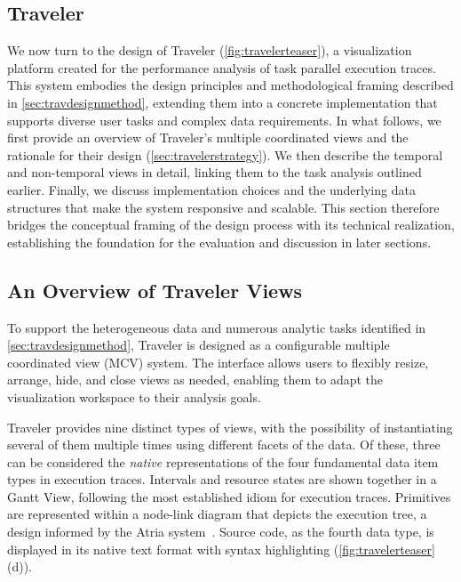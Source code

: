 \begin{refsection}
\section{Traveler}
\label{sec:travelerdesc}

We now turn to the design of Traveler (\autoref{fig:travelerteaser}), a visualization platform created for the performance analysis of task parallel execution traces. This system embodies the design principles and methodological framing described in \autoref{sec:travdesignmethod}, extending them into a concrete implementation that supports diverse user tasks and complex data requirements. In what follows, we first provide an overview of Traveler's multiple coordinated views and the rationale for their design (\autoref{sec:travelerstrategy}). We then describe the temporal and non-temporal views in detail, linking them to the task analysis outlined earlier. Finally, we discuss implementation choices and the underlying data structures that make the system responsive and scalable. This section therefore bridges the conceptual framing of the design process with its technical realization, establishing the foundation for the evaluation and discussion in later sections.

\subsection{An Overview of Traveler Views}
\label{sec:travelerstrategy}

To support the heterogeneous data and numerous analytic tasks identified in \autoref{sec:travdesignmethod}, Traveler is designed as a configurable multiple coordinated view (MCV) system. The interface allows users to flexibly resize, arrange, hide, and close views as needed, enabling them to adapt the visualization workspace to their analysis goals.

Traveler provides nine distinct types of views, with the possibility of instantiating several of them multiple times using different facets of the data. Of these, three can be considered the {\em native} representations of the four fundamental data item types in execution traces. Intervals and resource states are shown together in a Gantt View, following the most established idiom for execution traces. Primitives are represented within a node-link diagram that depicts the execution tree, a design informed by the Atria system~\cite{williams2020movingtarget}. Source code, as the fourth data type, is displayed in its native text format with syntax highlighting (\autoref{fig:travelerteaser}(d)).


\end{refsection}
